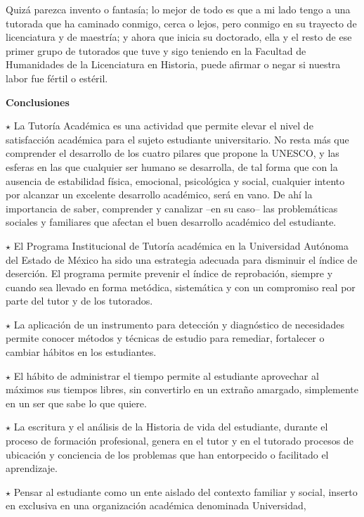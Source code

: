 Quizá parezca invento o fantasía; lo mejor de todo es que a mi lado tengo a
una tutorada que ha caminado conmigo, cerca o lejos, pero conmigo en su
trayecto de licenciatura y de maestría; y ahora que inicia su doctorado, ella
y el resto de ese primer grupo de tutorados que tuve y sigo teniendo en la
Facultad de Humanidades de la Licenciatura en Historia, puede afirmar o
negar si nuestra labor fue fértil o estéril.


\bigskip
\textbf{Conclusiones}

\begin{Obs}
\item[$\star$] 
La Tutoría Académica es una actividad que permite elevar el nivel de
satisfacción académica para el sujeto estudiante universitario. No resta
más que comprender el desarrollo de los cuatro pilares que propone la
UNESCO, y las esferas en las que cualquier ser humano se desarrolla, de tal
forma que con la ausencia de estabilidad física, emocional, psicológica y
social, cualquier intento por alcanzar un excelente desarrollo académico,
será en vano. De ahí la importancia de saber, comprender y canalizar --en su
caso-- las problemáticas sociales y familiares que afectan el buen
desarrollo académico del estudiante.
\item[$\star$]  El Programa Institucional de Tutoría académica en la Universidad Autónoma
del Estado de México ha sido una estrategia adecuada para disminuir el
índice de deserción. El programa permite prevenir el índice de reprobación,
siempre y cuando sea llevado en forma metódica, sistemática y con un
compromiso real por parte del tutor y de los tutorados.
\item[$\star$] La aplicación de un instrumento para detección y diagnóstico de necesidades
permite conocer métodos y técnicas de estudio para remediar, fortalecer o
cambiar hábitos en los estudiantes.
\item[$\star$] El hábito de administrar el tiempo permite al estudiante aprovechar al
máximos sus tiempos libres, sin convertirlo en un extraño amargado,
simplemente en un ser que sabe lo que quiere.
\item[$\star$] La escritura y el análisis de la Historia de vida del estudiante, durante el
proceso de formación profesional, genera en el tutor y en el tutorado procesos
de ubicación y conciencia de los problemas que han entorpecido o facilitado
el aprendizaje.
\item[$\star$] Pensar al estudiante como un ente aislado del contexto familiar y social,
inserto en exclusiva en una organización académica denominada Universidad,

\end{Obs}
